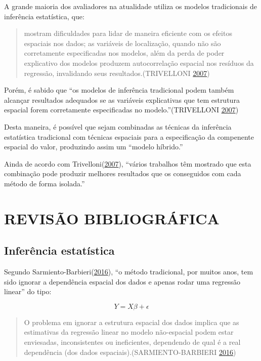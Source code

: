 \documentclass[12pt,]{article}
\begin{document}
A grande maioria dos avaliadores na atualidade utiliza os modelos
tradicionais de inferência estatística, que:

\begin{quote}
mostram dificuldades para lidar de maneira eficiente com os efeitos
espaciais nos dados; as variáveis de localização, quando não são
corretamente especificadas nos modelos, além da perda de poder
explicativo dos modelos produzem autocorrelação espacial nos resíduos da
regressão, invalidando seus resultados.(TRIVELLONI
\protect\hyperlink{ref-trivelloni07}{2007})
\end{quote}

Porém, é sabido que ``os modelos de inferência tradicional podem também
alcançar resultados adequados se as variáveis explicativas que tem
estrutura espacial forem corretamente especificadas no
modelo.''(TRIVELLONI \protect\hyperlink{ref-trivelloni07}{2007})

Desta maneira, é possível que sejam combinadas as técnicas da inferência
estatística tradicional com técnicas espaciais para a especificação da
compenente espacial do valor, produzindo assim um ``modelo híbrido.''

Ainda de acordo com
Trivelloni(\protect\hyperlink{ref-trivelloni07}{2007}), ``vários
trabalhos têm mostrado que esta combinação pode produzir melhores
resultados que os conseguidos com cada método de forma isolada.''

\section{REVISÃO BIBLIOGRÁFICA}\label{revisao-bibliografica}

\subsection{Inferência estatística}\label{inferencia-estatistica}

Segundo
Sarmiento-Barbieri(\protect\hyperlink{ref-sarmiento-barbieri}{2016}),
``o método tradicional, por muitos anos, tem sido ignorar a dependência
espacial dos dados e apenas rodar uma regressão linear'' do tipo:

\begin{equation}
  \label{eq-OLS}
  Y = X\beta + \epsilon
\end{equation}

\begin{quote}
O problema em ignorar a estrutura espacial dos dados implica que as
estimativas da regressão linear no modelo não-espacial podem estar
enviesadas, inconsistentes ou ineficientes, dependendo de qual é a real
dependência (dos dados espaciais).(SARMIENTO-BARBIERI
\protect\hyperlink{ref-sarmiento-barbieri}{2016})
\end{quote}
\end{document}
